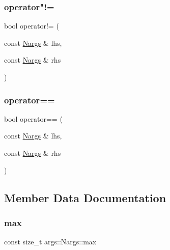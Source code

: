 \subsubsection{\texorpdfstring{operator"!=}{operator!=}}
{\footnotesize\ttfamily bool operator!= (\begin{DoxyParamCaption}\item[{const \hyperlink{structargs_1_1_nargs}{Nargs} \&}]{lhs,  }\item[{const \hyperlink{structargs_1_1_nargs}{Nargs} \&}]{rhs }\end{DoxyParamCaption})\hspace{0.3cm}{\ttfamily [friend]}}

\mbox{\label{structargs_1_1_nargs_ade1401f3b2f06774e60f90614702d930}} 
\subsubsection{\texorpdfstring{operator==}{operator==}}
{\footnotesize\ttfamily bool operator== (\begin{DoxyParamCaption}\item[{const \hyperlink{structargs_1_1_nargs}{Nargs} \&}]{lhs,  }\item[{const \hyperlink{structargs_1_1_nargs}{Nargs} \&}]{rhs }\end{DoxyParamCaption})\hspace{0.3cm}{\ttfamily [friend]}}



\subsection{Member Data Documentation}
\mbox{\label{structargs_1_1_nargs_a03905b656f58dd338a7d65f801694b16}} 
\subsubsection{\texorpdfstring{max}{max}}
{\footnotesize\ttfamily const size\+\_\+t args\+::\+Nargs\+::max}

\mbox{\label{structargs_1_1_nargs_accb94d349138f6b760ace606204df756}} 
